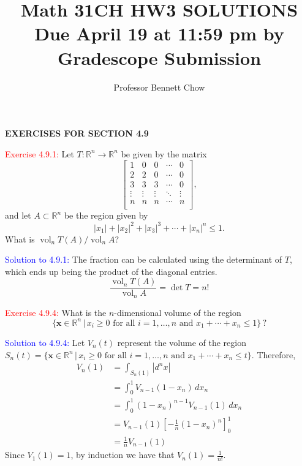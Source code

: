 \documentclass[12pt]{article}
\title{Math 31CH HW3 SOLUTIONS \\ Due April 19 at 11:59 pm by Gradescope Submission}
\author{Professor Bennett Chow}
\date{}
\DeclareMathOperator{\vol}{vol}
\newcommand{\RR}{\mathbb{R}}
\begin{document}
\maketitle



\begin{center}
   \textbf{EXERCISES FOR SECTION 4.9}
\end{center}

\textcolor{red}{Exercise 4.9.1:}
Let $T:\RR^n\to \RR^n$ be given by the matrix
\begin{equation*}
    \begin{bmatrix}
    1 & 0 & 0 & \cdots & 0 \\
    2 & 2 & 0 & \cdots & 0 \\
    3 & 3 & 3 & \cdots & 0 \\
    \vdots  & \vdots & \vdots & \ddots & \vdots \\
    n & n & n & \cdots & n \\
    \end{bmatrix} ,
\end{equation*}
and let $A \subset \RR^n$ be the region given by
\begin{equation*}
    |x_1| +|x_2|^2 +|x_3|^3 +\cdots+ |x_n|^n \leq 1.
\end{equation*}
What is $\operatorname{vol}_n T(A) / \operatorname{vol}_n A$?\smallskip

\textcolor{blue}{Solution to 4.9.1:}
The fraction can be calculated using the determinant of $T$,
which ends up being the product of the diagonal entries.
\[
    \frac{\vol_n T(A)}{\vol_n A} = \det T = n!
\]
\newpage


\textcolor{red}{Exercise 4.9.4:}
What is the $n$-dimensional volume of the region
\begin{equation*}
    \big\{ \mathbf{x}\in \RR^n \, | \, x_i \geq 0 \text{ for all } i=1,\ldots,n \text{ and } x_1+\cdots + x_n \leq 1 \big\} \,?
\end{equation*}

\textcolor{blue}{Solution to 4.9.4:}
Let $V_n(t)$ represent the volume of the region 
$S_n(t) = \big\{ \mathbf{x}\in \RR^n \, | \, x_i \geq 0 \text{ for all } i=1,\ldots,n \text{ and } x_1+\cdots + x_n \leq t \big\}$.
Therefore, 
\begin{align*}
    V_n(1) 
    &= \int_{S_n(1)} |d^n x| \\
    &= \int _0^1 V_{n-1}(1-x_n) \,dx_n \\
    &= \int _0^1 (1-x_n)^{n-1} V_{n-1}(1) \,dx_n \\
    &= V_{n-1}(1) \left[ -\frac{1}{n} (1-x_n)^n \right]_0^1 \\
    &= \frac{1}{n} V_{n-1}(1)
\end{align*}
Since $V_1(1) = 1$, by induction we have that $V_n(1) = \frac{1}{n!}$.
\newpage
\end{document}
